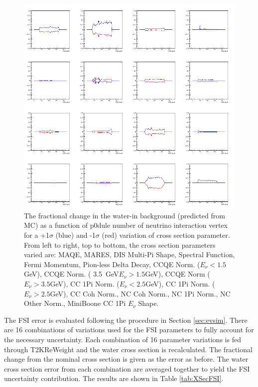 \newpage
\begin{figure}[h]
\centering
\includegraphics[width=5in]{Figures/TN100Plots/c_12_0.png}
\caption{The fractional change in the water-in background (predicted from MC) as a function of p0dule number of neutrino interaction vertex for a +1$\sigma$ (blue) and -1$\sigma$ (red) variation of cross section parameter. From left to right, top to bottom, the cross section parameters varied are: MAQE, MARES, DIS Multi-Pi Shape, Spectral Function, Fermi Momentum, Pion-less Delta Decay, CCQE Norm. ($E_\nu < 1.5$GeV), CCQE Norm. ( 3.5~GeV$E_\nu>1.5$GeV), CCQE Norm ($E_\nu > 3.5$GeV), CC 1Pi Norm. ($E_\nu < 2.5$GeV), CC 1Pi Norm. ($E_\nu > 2.5$GeV), CC Coh Norm., NC Coh Norm., NC 1Pi Norm., NC Other Norm., MiniBoone CC 1Pi $E_\nu$ Shape.}
\label{fig:xsvar2}
\end{figure}

The FSI error is evaluated following the procedure in Section \ref{sec:evsim}. There are 16 combinations of variations used for the FSI parameters to fully account for the necessary uncertainty. Each combination of 16 parameter variations is fed through T2KReWeight and the water cross section is recalculated. The fractional change from the nominal cross section is given as the error as before. The water cross section error from each combination are averaged together to yield the FSI uncertainty contribution. The results are shown in Table \ref{tab:XSecFSI}.

